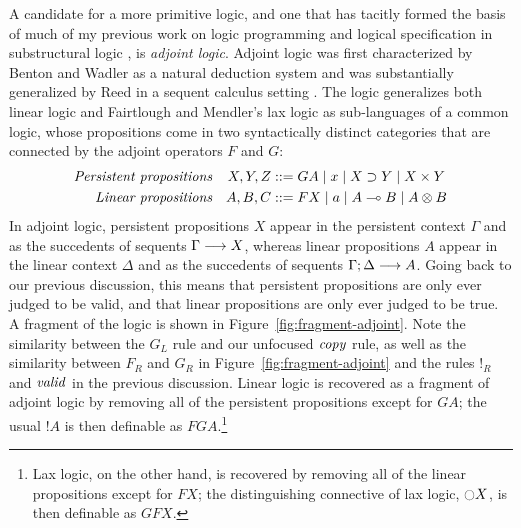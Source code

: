 A candidate for a more primitive logic, and one that has tacitly
formed the basis of much of my previous work on logic programming and
logical specification in substructural logic
\cite{pfenning09substructural,simmons11weak,simmons11logical}, 
is {\it adjoint logic}.
Adjoint logic was first characterized by Benton and Wadler as a
natural deduction system \cite{benton96linear} and was substantially
generalized by Reed in a sequent calculus setting
\cite{reed09judgmental}. The logic generalizes both linear logic and
Fairtlough and Mendler's lax logic \cite{fairtlough95propositional}
as sub-languages of a common logic, whose propositions come
in two syntactically distinct categories that are connected by the
adjoint operators $F$ and $G$:
\begin{align*}
\mbox{\it Persistent propositions} & &
X, Y, Z & ::= G A \mid x \mid X \supset Y \mid X \times Y\\
\mbox{\it Linear propositions} & & 
A, B, C & ::= F X \mid a \mid A \multimap B \mid A \otimes B
\end{align*}
In adjoint logic, persistent propositions $X$ appear in the
persistent context $\Gamma$ and as the succedents of sequents
${\Gamma} \longrightarrow {X} \mathstrut$, whereas linear propositions $A$ appear in
the linear context $\Delta$ and as the succedents of sequents
${\Gamma};{\Delta} \longrightarrow {A} \mathstrut$. Going back to our previous discussion,
this means that persistent propositions are only ever judged
to be valid, and that linear propositions are only ever judged
to be true. A fragment of the logic is shown in
Figure~\ref{fig:fragment-adjoint}.  Note the similarity between the
$G_L$ rule and our unfocused ${\it copy}$ rule, as well as the
similarity between $F_R$ and $G_R$ in
Figure~\ref{fig:fragment-adjoint} and the rules ${!}_R$ and ${\it
  valid}$ in the previous discussion.  Linear logic is recovered as a
fragment of adjoint logic by removing all of the persistent
propositions except for $GA$; the usual ${!}A$ is then definable as
$FGA$.\footnote{Lax logic, on the other hand, is recovered by removing
  all of the linear propositions except for $FX$; the distinguishing
  connective of lax logic, $\ocircle X$, is then definable as $GFX$.}

